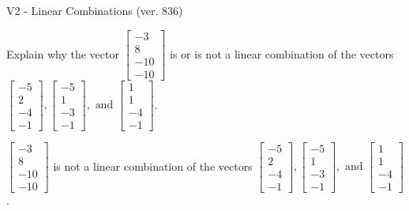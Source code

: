 \begin{exercise}
  \begin{exerciseTitle}V2 - Linear Combinations (ver. 836)\end{exerciseTitle}
  \begin{exerciseStatement}
    Explain why the vector \(\left[\begin{array}{c}
-3 \\
8 \\
-10 \\
-10
\end{array}\right]\)  is or is not a linear 
	combination of the vectors \(\left[\begin{array}{c}
-5 \\
2 \\
-4 \\
-1
\end{array}\right] , \left[\begin{array}{c}
-5 \\
1 \\
-3 \\
-1
\end{array}\right] , \text{ and } \left[\begin{array}{c}
1 \\
1 \\
-4 \\
-1
\end{array}\right]\).
	


  \end{exerciseStatement}
  \begin{exerciseAnswer}
   \(\left[\begin{array}{c}
-3 \\
8 \\
-10 \\
-10
\end{array}\right]\) 
  	 is not  
	a linear combination of the vectors \(\left[\begin{array}{c}
-5 \\
2 \\
-4 \\
-1
\end{array}\right] , \left[\begin{array}{c}
-5 \\
1 \\
-3 \\
-1
\end{array}\right] , \text{ and } \left[\begin{array}{c}
1 \\
1 \\
-4 \\
-1
\end{array}\right]\).

	
  


  \end{exerciseAnswer}
\end{exercise}